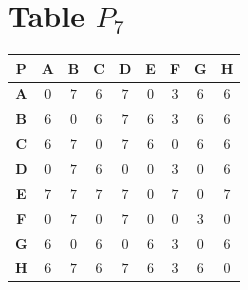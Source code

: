 \documentclass{article}
\begin{document}
\section{Table $P_{7}$}
\begin{center}
    \begin{tabular}{|c||c|c|c|c|c|c|c|c|}
        \hline
        \textbf{P} & \textbf{A} & \textbf{B} & \textbf{C} & \textbf{D} & \textbf{E} & \textbf{F} & \textbf{G} & \textbf{H} \\
        \hline
        \hline
        \textbf{A}& 0 & \cellcolor[HTML]{D74894}$7$ & 6 & \cellcolor[HTML]{D74894}$7$ & 0 & 3 & 6 & 6 \\
        \hline
        \textbf{B}& 6 & 0 & 6 & \cellcolor[HTML]{D74894}$7$ & 6 & 3 & 6 & 6 \\
        \hline
        \textbf{C}& 6 & \cellcolor[HTML]{D74894}$7$ & 0 & \cellcolor[HTML]{D74894}$7$ & 6 & 0 & 6 & 6 \\
        \hline
        \textbf{D}& 0 & \cellcolor[HTML]{D74894}$7$ & 6 & 0 & 0 & 3 & 0 & 6 \\
        \hline
        \textbf{E}& \cellcolor[HTML]{D74894}$7$ & \cellcolor[HTML]{D74894}$7$ & \cellcolor[HTML]{D74894}$7$ & \cellcolor[HTML]{D74894}$7$ & 0 & \cellcolor[HTML]{D74894}$7$ & 0 & \cellcolor[HTML]{D74894}$7$ \\
        \hline
        \textbf{F}& 0 & \cellcolor[HTML]{D74894}$7$ & 0 & \cellcolor[HTML]{D74894}$7$ & 0 & 0 & 3 & 0 \\
        \hline
        \textbf{G}& 6 & 0 & 6 & 0 & 6 & 3 & 0 & 6 \\
        \hline
        \textbf{H}& 6 & \cellcolor[HTML]{D74894}$7$ & 6 & \cellcolor[HTML]{D74894}$7$ & 6 & 3 & 6 & 0 \\
        \hline
    \end{tabular}
\end{center}
\end{document}
